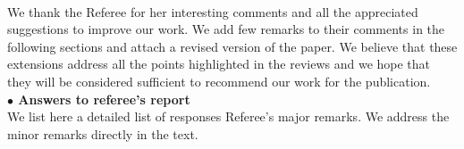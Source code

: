\documentclass{article}
\begin{document}
\\

\noindent
We thank the Referee for her interesting comments and all the appreciated suggestions to improve our work. We add few remarks to their comments in the following sections and attach a revised version of the paper. We believe that these extensions address all the points highlighted in the reviews and we hope that they will be considered sufficient to recommend our work for the publication.\\

{\bf $\bullet$ Answers to referee's report}\\

We list here a detailed list of responses Referee's major remarks. We address the minor remarks directly in the text.
\end{document}

